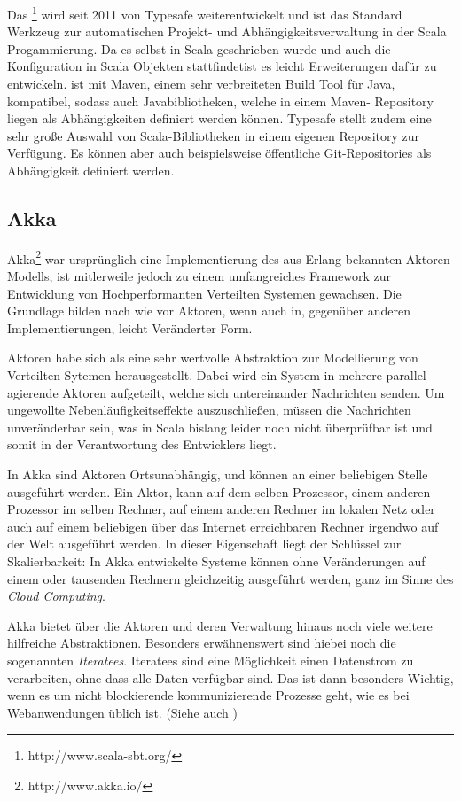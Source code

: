 Das \footnote{http://www.scala-sbt.org/} wird seit 2011 von Typesafe weiterentwickelt und
ist das Standard Werkzeug zur automatischen Projekt- und Abhängigkeitsverwaltung in der Scala
Progammierung. Da es selbst in Scala geschrieben wurde und auch die Konfiguration in Scala Objekten
stattfindetist es leicht Erweiterungen dafür zu entwickeln.  ist mit Maven, einem sehr
verbreiteten Build Tool für Java, kompatibel, sodass auch Javabibliotheken, welche in einem Maven-
Repository liegen als Abhängigkeiten definiert werden können. Typesafe stellt zudem eine sehr große
Auswahl von Scala-Bibliotheken in einem eigenen Repository zur Verfügung. Es können aber auch
beispielsweise öffentliche Git-Repositories als Abhängigkeit definiert werden.

\subsection{Akka}
\label{sec:akka}

Akka\footnote{http://www.akka.io/} war ursprünglich eine Implementierung des aus Erlang bekannten
Aktoren Modells, ist mitlerweile jedoch zu einem umfangreiches Framework zur Entwicklung von
Hochperformanten Verteilten Systemen gewachsen. Die Grundlage bilden nach wie vor Aktoren, wenn auch
in, gegenüber anderen Implementierungen, leicht Veränderter Form. \cite{actors}

Aktoren habe sich als eine sehr wertvolle Abstraktion zur Modellierung von Verteilten Sytemen
herausgestellt. Dabei wird ein System in mehrere parallel agierende Aktoren aufgeteilt, welche sich
untereinander Nachrichten senden. Um ungewollte Nebenläufigkeitseffekte auszuschließen, müssen die
Nachrichten unveränderbar sein, was in Scala bislang leider noch nicht überprüfbar ist und somit in
der Verantwortung des Entwicklers liegt.

In Akka sind Aktoren Ortsunabhängig, und können an einer beliebigen Stelle ausgeführt werden. Ein
Aktor, kann auf dem selben Prozessor, einem anderen Prozessor im selben Rechner, auf einem anderen
Rechner im lokalen Netz oder auch auf einem beliebigen über das Internet erreichbaren Rechner
irgendwo auf der Welt ausgeführt werden. In dieser Eigenschaft liegt der Schlüssel zur
Skalierbarkeit: In Akka entwickelte Systeme können ohne Veränderungen auf einem oder tausenden
Rechnern gleichzeitig ausgeführt werden, ganz im Sinne des \textit{Cloud Computing}.

Akka bietet über die Aktoren und deren Verwaltung hinaus noch viele weitere hilfreiche
Abstraktionen. Besonders erwähnenswert sind hiebei noch die sogenannten \textit{Iteratees}.
Iteratees sind eine Möglichkeit einen Datenstrom zu verarbeiten, ohne dass alle Daten verfügbar
sind. Das ist dann besonders Wichtig, wenn es um nicht blockierende kommunizierende Prozesse geht,
wie es bei Webanwendungen üblich ist. (Siehe auch \cite{iteratees})

